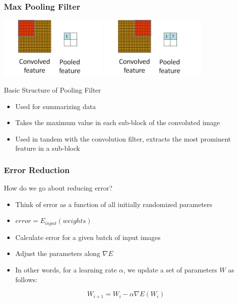\documentclass{beamer}
\begin{document}
\begin{frame}

	\frametitle{Max Pooling Filter}
    \begin{center}
	\includegraphics[width=0.40\textwidth]{Pooling_schematic-0.png}
	\includegraphics[width=0.40\textwidth]{Pooling_schematic-1.png} \\
	\begin{tiny}
	Basic Structure of Pooling Filter
	\end{tiny}
	\end{center}
	\begin{itemize}
	\item Used for summarizing data
	\item Takes the maximum value in each sub-block of the convoluted image
	\item Used in tandem with the convolution filter, extracts the most prominent feature in a sub-block
	\end{itemize}
    
\end{frame}

\begin{frame}

    \frametitle{Error Reduction}
    How do we go about reducing error?
    \begin{itemize}
    \item Think of error as a function of all initially randomized parameters
    \item $error = E_{input}(weights)$
    \item Calculate error for a given batch of input images
    \item Adjust the parameters along $\nabla E$
    \item In other words, for a learning rate $\alpha$, we update a set of parameters $W$ as follows:
    \end{itemize}
    \begin{equation*}
    W_{i+1} = W_i - \alpha \nabla E(W_i)
    \end{equation*}
    
\end{frame}
\end{document}
